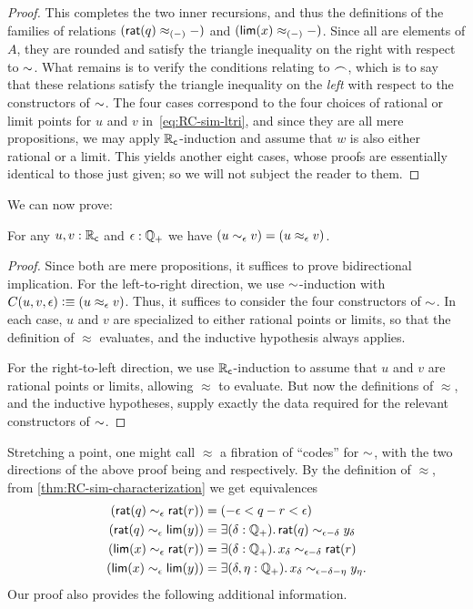 \begin{proof}
  This completes the two inner recursions, and thus the definitions of the families of relations $(\mathsf{rat}(q)\approx_{(-)}-)$ and $(\mathsf{lim}(x)\approx_{(-)}-)$.
  Since all are elements of $A$, they are rounded and satisfy the triangle inequality on the right with respect to $\mathord\sim$.
  What remains is to verify the conditions relating to $\frown$, which is to say that these relations satisfy the triangle inequality on the \emph{left} with respect to the constructors of $\mathord\sim$.
  The four cases correspond to the four choices of rational or limit points for $u$ and $v$ in~\eqref{eq:RC-sim-ltri}, and since they are all mere propositions, we may apply $\mathbb{R}_\mathsf{c}$-induction and assume that $w$ is also either rational or a limit.
  This yields another eight cases, whose proofs are essentially identical to those just given; so we will not subject the reader to them.
\end{proof}

We can now prove:

\begin{thm}\label{thm:RC-sim-characterization}
  For any $u,v:\mathbb{R}_\mathsf{c}$ and $\epsilon:\mathbb{Q}_{+}$ we have $(u\sim_{\epsilon} v) = (u\approx_\epsilon v)$.
\end{thm}
\begin{proof}
  Since both are mere propositions, it suffices to prove bidirectional implication.
  For the left-to-right direction, we use $\mathord\sim$-induction with $C(u,v,\epsilon)\vcentcolon\equiv (u\approx_\epsilon v)$.
  Thus, it suffices to consider the four constructors of $\mathord\sim$.
  In each case, $u$ and $v$ are specialized to either rational points or limits, so that the definition of $\approx$ evaluates, and the inductive hypothesis always applies.

  For the right-to-left direction, we use $\mathbb{R}_\mathsf{c}$-induction to assume that $u$ and $v$ are rational points or limits, allowing $\approx$ to evaluate.
  But now the definitions of $\approx$, and the inductive hypotheses, supply exactly the data required for the relevant constructors of $\mathord\sim$.
\end{proof}

Stretching a point, one might call $\approx$ a fibration of ``codes'' for $\mathord\sim$, with the two directions of the above proof being \encode and \decode respectively.
By the definition of $\approx$, from \autoref{thm:RC-sim-characterization} we get equivalences
\begin{align*}
  (\rcrat(q) \close\epsilon \rcrat(r))  &=
  (-\epsilon < q - r < \epsilon)\\
  (\rcrat(q) \close\epsilon \rclim(y)) &=
  \exis{\delta : \Qp} \rcrat(q) \close{\epsilon - \delta} y_\delta\\
  (\rclim(x) \close\epsilon \rcrat(r)) &=
  \exis{\delta : \Qp} x_\delta \close{\epsilon - \delta} \rcrat(r)\\
  (\rclim(x) \close\epsilon \rclim(y)) &=
  \exis{\delta, \eta : \Qp} x_\delta \close{\epsilon - \delta - \eta} y_\eta.
\end{align*}
Our proof also provides the following additional information.

